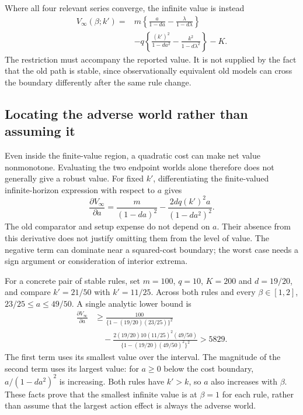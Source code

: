 Where all four relevant series converge, the infinite value is instead
\begin{equation}
 \begin{split}
 V_\infty(\beta;k')={}&m\left\{\frac{a}{1-da}
                       -\frac{\lambda}{1-d\lambda}\right\}\\
 &-q\left\{\frac{(k')^2}{1-da^2}
                       -\frac{k^2}{1-d\lambda^2}\right\}-K.
 \end{split}
 \label{exec17:s6-full-infinite}
\end{equation}
The restriction must accompany the reported value. It is not supplied by
the fact that the old path is stable, since observationally equivalent
old models can cross the boundary differently after the same rule change.

\subsection{Locating the adverse world rather than assuming it}
\label{exec17:s6-rule-value}

Even inside the finite-value region, a quadratic cost can make net value
nonmonotone. Evaluating the two endpoint worlds alone therefore does not
generally give a robust value. For fixed $k'$, differentiating the
finite-valued infinite-horizon expression with respect to $a$ gives
\begin{equation}
 \frac{\partial V_\infty}{\partial a}
  =\frac{m}{(1-da)^2}
   -\frac{2dq(k')^2a}{(1-da^2)^2}.
 \label{exec17:s6-full-derivative}
\end{equation}
The old comparator and setup expense do not depend on $a$. Their absence
from this derivative does not justify omitting them from the level of
value. The negative term can dominate near a squared-cost boundary;
the worst case needs a sign argument or consideration of interior extrema.

For a concrete pair of stable rules, set $m=100$, $q=10$, $K=200$ and
$d=19/20$, and compare $k'=21/50$ with $k'=11/25$. Across both rules
and every $\beta\in[1,2]$, $23/25\leq a\leq49/50$. A single analytic
lower bound is
\begin{equation}
 \begin{split}
 \frac{\partial V_\infty}{\partial a}
 &\geq\frac{100}{\{1-(19/20)(23/25)\}^2}\\
 &\quad-\frac{2(19/20)10(11/25)^2(49/50)}
                   {\{1-(19/20)(49/50)^2\}^2}
 >5829.
 \end{split}
 \label{exec17:s6-controller-monotone}
\end{equation}
The first term uses its smallest value over the interval. The magnitude
of the second term uses its largest value: for $a\geq0$ below the
cost boundary, $a/(1-da^2)^2$ is increasing. Both rules have $k'>k$,
so $a$ also increases with $\beta$. These facts prove that the smallest
infinite value is at $\beta=1$ for each rule, rather than assume that
the largest action effect is always the adverse world.

